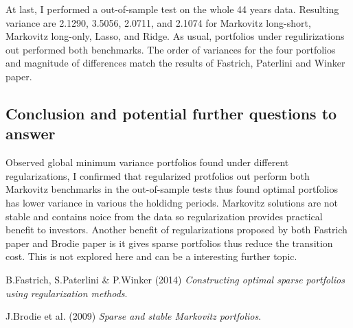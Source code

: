 \documentclass{article}
\begin{document}
At last, I performed a out-of-sample test on the whole 44 years data. Resulting
variance are 2.1290, 3.5056, 2.0711, and 2.1074 for Markovitz long-short,
Markovitz long-only, Lasso, and Ridge. As usual, portfolios under regulirizations
out performed both benchmarks. The order of variances for the four portfolios
and magnitude of differences
match the results of Fastrich, Paterlini and Winker paper.

\subsection*{Conclusion and potential further questions to answer}

Observed global minimum variance portfolios found under different regularizations,
I confirmed that regularized protfolios out perform both Markovitz benchmarks
in the out-of-sample tests thus found optimal portfolios has lower variance in various
the holdidng periods. Markovitz solutions are not stable and contains noice from the
data so regularization provides practical benefit to investors. Another benefit
of regularizations proposed by both Fastrich paper and Brodie paper is it gives
sparse portfolios thus reduce the transition cost. This is not explored here and
can be a interesting further topic.

\begin{thebibliography}{9}
B.Fastrich, S.Paterlini \& P.Winker (2014)
\textit{Constructing optimal sparse portfolios using regularization methods}.

J.Brodie et al. (2009)
\textit{Sparse and stable Markovitz portfolios}.
\end{thebibliography}
\end{document}
